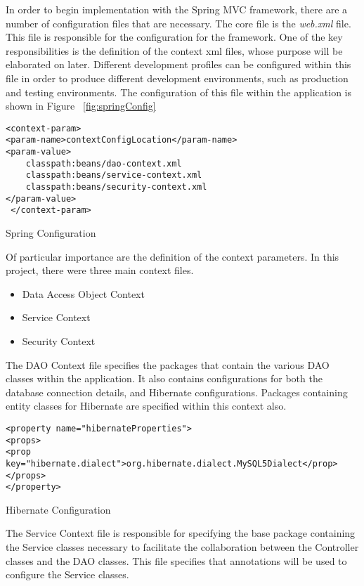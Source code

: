In order to begin implementation with the Spring MVC framework, there are a number of configuration files that are necessary. The core file is the \textit{web.xml} file. This file is responsible for the configuration for the framework. One of the key responsibilities is the definition of the context xml files, whose purpose will be elaborated on later. Different development profiles can be configured within this file in order to produce different development environments, such as production and testing environments. The configuration of this file within the application is shown in Figure ~\ref{fig:springConfig} \newline 
\begin{table}[H]
\begin{lstlisting}
<context-param>
<param-name>contextConfigLocation</param-name>
<param-value>
	classpath:beans/dao-context.xml
	classpath:beans/service-context.xml
	classpath:beans/security-context.xml
</param-value>
 </context-param>
\end{lstlisting}
\caption{Spring Configuration}
\label{fig:springConfig}
\end{table}

Of particular importance are the definition of the context parameters. In this project, there were three main context files.

\begin{itemize}
\item Data Access Object Context
\item Service Context
\item Security Context
\end{itemize}

The DAO Context file specifies the packages that contain the various DAO classes within the application. It also contains configurations for both the database connection details, and Hibernate configurations. Packages containing entity classes for Hibernate are specified within this context also. \newline

\begin{table}
\begin{lstlisting}
<property name="hibernateProperties">
<props>
<prop key="hibernate.dialect">org.hibernate.dialect.MySQL5Dialect</prop>
</props>
</property>
\end{lstlisting}
\caption{Hibernate Configuration}
\end{table}


The Service Context file is responsible for specifying the base package containing the Service classes necessary to facilitate the collaboration between the Controller classes and the DAO classes. This file specifies that annotations will be used to configure the Service classes.\newline

